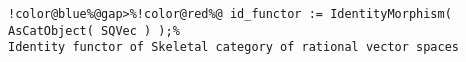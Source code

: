 \begin{Verbatim}[commandchars=!@\%,frame=single]
!color@blue%@gap>%!color@red%@ id_functor := IdentityMorphism( AsCatObject( SQVec ) );%
Identity functor of Skeletal category of rational vector spaces
\end{Verbatim}
